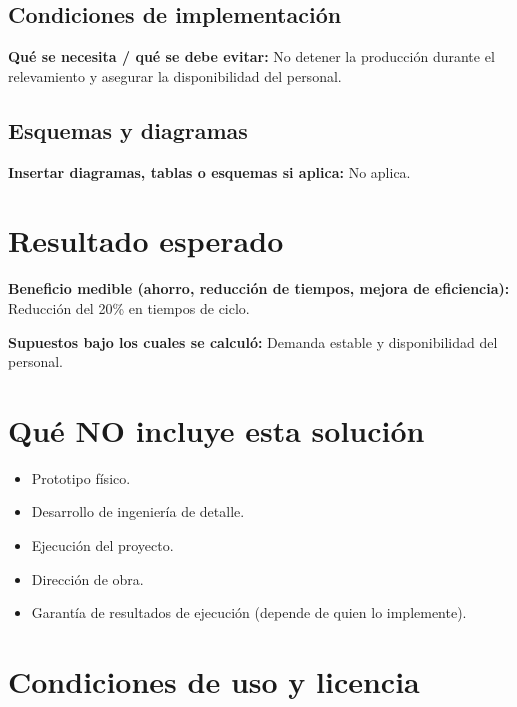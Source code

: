 \documentclass[11pt,a4paper]{article}
\newcommand{\campo}[2]{\noindent\textbf{\textcolor{irdblack}{#1:}} \textcolor{irdblack}{#2}\par\vspace{0.3em}}
\begin{document}
\subsection{Condiciones de implementación}
\campo{Qué se necesita / qué se debe evitar}{No detener la producción durante el relevamiento y asegurar la disponibilidad del personal.}

\subsection{Esquemas y diagramas}
\campo{Insertar diagramas, tablas o esquemas si aplica}{No aplica.}

\section{Resultado esperado}

\campo{Beneficio medible (ahorro, reducción de tiempos, mejora de eficiencia)}{Reducción del 20\% en tiempos de ciclo.}
\campo{Supuestos bajo los cuales se calculó}{Demanda estable y disponibilidad del personal.}

\section{Qué NO incluye esta solución}

\begin{alertbox}
\begin{itemize}[leftmargin=1.2em, itemsep=2pt]
    \item Prototipo físico.
    \item Desarrollo de ingeniería de detalle.
    \item Ejecución del proyecto.
    \item Dirección de obra.
    \item Garantía de resultados de ejecución (depende de quien lo implemente).
\end{itemize}
\end{alertbox}

\section{Condiciones de uso y licencia}
\end{document}
